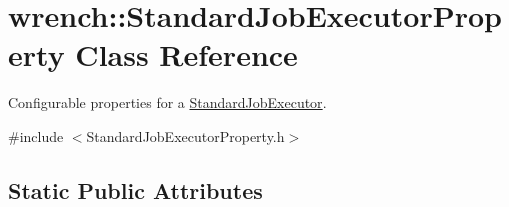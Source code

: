 \hypertarget{classwrench_1_1_standard_job_executor_property}{}\section{wrench\+:\+:Standard\+Job\+Executor\+Property Class Reference}
\label{classwrench_1_1_standard_job_executor_property}


Configurable properties for a \hyperlink{classwrench_1_1_standard_job_executor}{Standard\+Job\+Executor}.  




{\ttfamily \#include $<$Standard\+Job\+Executor\+Property.\+h$>$}

\subsection*{Static Public Attributes}
